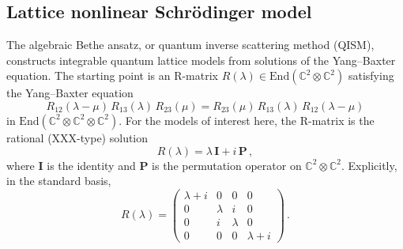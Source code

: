 \documentclass[11pt,a4paper]{article}
\theoremstyle{definition}
\begin{document}
\subsection{Lattice nonlinear Schr\"odinger model}
\label{sec.lattice-NLS}
The algebraic Bethe ansatz, or quantum inverse scattering method (QISM),
constructs integrable quantum lattice models from
solutions of the Yang--Baxter equation.  The starting point is an
R-matrix $R(\lambda) \in \mathrm{End}(\mathbb{C}^2 \otimes
\mathbb{C}^2)$ satisfying the Yang--Baxter equation
\begin{equation}\label{eq.YBE}
  R_{12}(\lambda - \mu)\,R_{13}(\lambda)\,R_{23}(\mu)
  = R_{23}(\mu)\,R_{13}(\lambda)\,R_{12}(\lambda - \mu)
\end{equation}
in $\mathrm{End}(\mathbb{C}^2 \otimes \mathbb{C}^2 \otimes
\mathbb{C}^2)$.  For the models of interest here, the R-matrix is the
rational (XXX-type) solution
\begin{equation}\label{eq.R-matrix}
  R(\lambda) = \lambda\,\mathbf{I} + i\,\mathbf{P}\,,
\end{equation}
where $\mathbf{I}$ is the identity and $\mathbf{P}$ is the
permutation operator on $\mathbb{C}^2 \otimes \mathbb{C}^2$.
Explicitly, in the standard basis,
\begin{equation}\label{eq.R-explicit}
  R(\lambda) =
  \begin{pmatrix}
    \lambda + i & 0 & 0 & 0 \\
    0 & \lambda & i & 0 \\
    0 & i & \lambda & 0 \\
    0 & 0 & 0 & \lambda + i
  \end{pmatrix}\,.
\end{equation}
\end{document}
